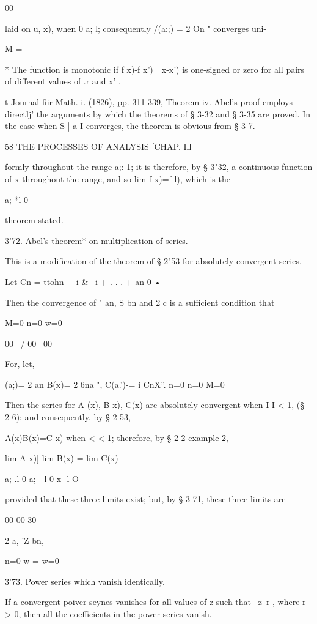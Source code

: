 00

laid on u, x), when 0 a; l; consequently /(a:;) = 2 On " converges
uni-

M =

* The function is monotonic if f x)-f x')\ \ x-x') is one-signed or
zero for all pairs of different values of .r and x' .

t Journal fiir Math. i. (1826), pp. 311-339, Theorem iv. Abel's proof
employs directlj' the arguments by which the theorems of § 3-32 and §
3-35 are proved. In the case when S | a I converges, the theorem is
obvious from § 3-7.



58 THE PROCESSES OF ANALYSIS [CHAP. Ill

formly throughout the range a;: 1; it is therefore, by § 3"32, a
continuous function of x throughout the range, and so lim f x)=f l),
which is the

a;-*l-0

theorem stated.

3'72. Abel's theorem* on multiplication of series.

This is a modification of the theorem of § 2"53 for absolutely
convergent series.

Let Cn = ttohn + i \& \ i + . . . + an 0 •

Then the convergence of " an, S bn and 2 c is a sufficient condition
that

M=0 n=0 w=0

 00 \ / 00 \ 00

For, let,

 (a;)= 2 an B(x)= 2 6na ", C(a.')-= i CnX''. n=0 n=0 M=0

Then the series for A (x), B x), C(x) are absolutely convergent when I
I < 1, (§ 2-6); and consequently, by § 2-53,

A(x)B(x)=C x) when < < 1; therefore, by § 2-2 example 2,

  lim A x)] lim B(x) = lim C(x)\

a; .l-0 a;- -l-0 x -l-O

provided that these three limits exist; but, by § 3-71, these three
limits are

00 00 30

2 a, 'Z bn, %

n=0 w = w=0

3'73. Power series which vanish identically.

If a convergent poiver seynes vanishes for all values of z such that \
z\ r-, where r > 0, then all the coefficients in the power series
vanish.

